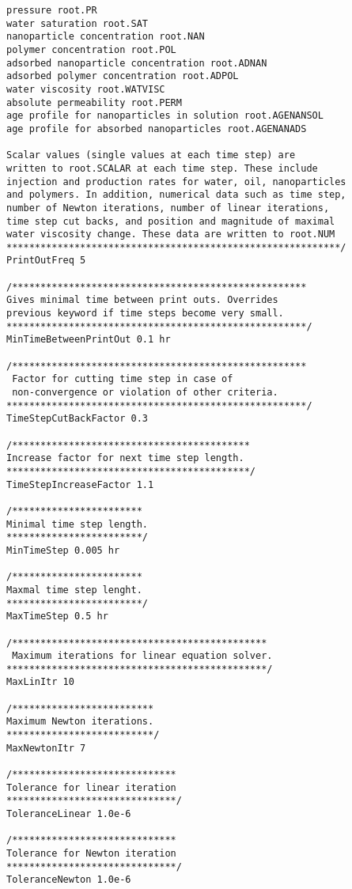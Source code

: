 \begin{appendices}
\begin{lstlisting}
pressure root.PR
water saturation root.SAT
nanoparticle concentration root.NAN 
polymer concentration root.POL
adsorbed nanoparticle concentration root.ADNAN 
adsorbed polymer concentration root.ADPOL
water viscosity root.WATVISC
absolute permeability root.PERM
age profile for nanoparticles in solution root.AGENANSOL
age profile for absorbed nanoparticles root.AGENANADS

Scalar values (single values at each time step) are 
written to root.SCALAR at each time step. These include
injection and production rates for water, oil, nanoparticles
and polymers. In addition, numerical data such as time step, 
number of Newton iterations, number of linear iterations, 
time step cut backs, and position and magnitude of maximal
water viscosity change. These data are written to root.NUM 
***********************************************************/
PrintOutFreq 5

/****************************************************
Gives minimal time between print outs. Overrides 
previous keyword if time steps become very small.
*****************************************************/
MinTimeBetweenPrintOut 0.1 hr

/****************************************************
 Factor for cutting time step in case of 
 non-convergence or violation of other criteria.
*****************************************************/
TimeStepCutBackFactor 0.3

/******************************************
Increase factor for next time step length.
*******************************************/
TimeStepIncreaseFactor 1.1

/***********************
Minimal time step length.
************************/
MinTimeStep 0.005 hr

/***********************
Maxmal time step lenght.
************************/
MaxTimeStep 0.5 hr

/*********************************************
 Maximum iterations for linear equation solver.
**********************************************/
MaxLinItr 10

/*************************
Maximum Newton iterations.
**************************/
MaxNewtonItr 7

/*****************************
Tolerance for linear iteration
******************************/
ToleranceLinear 1.0e-6

/*****************************
Tolerance for Newton iteration
******************************/
ToleranceNewton 1.0e-6


\end{lstlisting}
\end{appendices}
